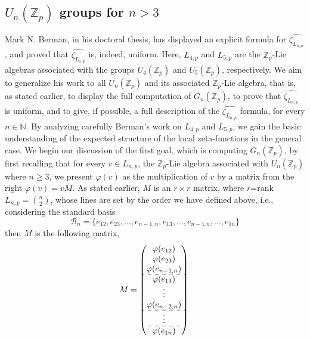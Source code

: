 \documentclass[12pt]{article}
\begin{document}
\subsection{$U_n(\mathbb{Z}_p)$ groups for $n>3$}
Mark N. Berman, in his doctoral thesis\cite{Berman}, has displayed an explicit formula for $\hat{\zeta_{L_{4,p}}}$, and proved that $\hat{\zeta_{L_{5,p}}}$ is, indeed, uniform. Here, $L_{4,p}$ and $L_{5,p}$ are the $\mathbb{Z}_p$-Lie algebras associated with the groups $U_4(\mathbb{Z}_p)$ and $U_5(\mathbb{Z}_p)$, respectively. We aim to generalize his work to all $U_n(\mathbb{Z}_p)$ and its associated $\mathbb{Z}_p$-Lie algebra, that is, as stated earlier, to display the full computation of $G_n(\mathbb{Z}_p)$, to prove that $\hat{\zeta_{L_{n,p}}}$ is uniform, and to give, if possible, a full description of the $\hat{\zeta_{L_{n,p}}}$ formula, for every $n\in\mathbb{N}$. By analyzing carefully Berman's work on $L_{4,p}$ and $L_{5,p}$, we gain the basic understanding of the expected structure of the local zeta-functions in the general case.
We begin our discussion of the first goal, which is computing $G_n(\mathbb{Z}_p)$, by first recalling that for every $v\in L_{n,p}$, the $\mathbb{Z}_p$-Lie algebra associated with $U_n(\mathbb{Z}_p)$ where $n\geq3$, we present $\varphi(v)$ as the multiplication of $v$ by a matrix from the right $\varphi(v)=vM$. As stated earlier, $M$ is an $r\times r$ matrix, where $r$=rank$L_{n,p}=\binom{n}{2}$, whose lines are set by the order we have defined above, i.e., considering the standard basis \[\mathcal{B}_n=\{e_{
12},e_{23},\dots,e_{n-1,n},e_{13},\dots,e_{n-1.n},\dots,e_{1n}\}\] then $M$ is the following matrix,
$$
M=\begin{pmatrix}
\varphi(e_{12})\\
\varphi(e_{23})\\
\varphi(e_{n-1,n})\\
\hdashline
\varphi(e_{13})\\
\vdots\\
\varphi(e_{n-2,n})\\
\hdashline
\vdots\\
\hdashline
\varphi(e_{1n})\\
\end{pmatrix}\\
$$
\end{document}
